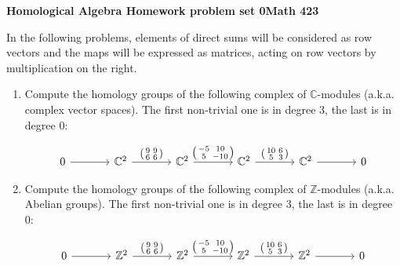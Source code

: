 \documentclass[12pt]{article}
\newcommand{\ZZ}{\mathbb{Z}}
\newcommand{\CC}{\mathbb{C}}
\begin{document}
\begin{center}{\Large
\vspace{2cm}

\bf  Homological Algebra Homework problem set 0\quad   Math 423\quad  \\
}
\vspace{.5in}

\end{center}

In the following problems, elements of direct sums will be considered
as row vectors and the maps will be expressed as matrices, acting on
row vectors by multiplication on the right. 

\begin{enumerate}
\item Compute the homology groups of the following complex of
$\CC$-modules (a.k.a. complex vector spaces). The first non-trivial
one is in degree 3, the last is in degree 0:

\[
\begin{tikzcd}[column sep=large,ampersand replacement=\&]
0 \arrow{r} \&
\CC^{2} \arrow{r}{
 \left( \begin{smallmatrix} 9 & 9 \\ 6 & 6 \end{smallmatrix}  \right) } \& 
\CC^{2} \arrow{r}{ \left( \begin{smallmatrix} -5 & 10 \\ 5 & -10 \end{smallmatrix}  \right) } \& 
\CC^{2} \arrow{r}{  \left( \begin{smallmatrix} 10 & 6 \\ 5 & 3 \end{smallmatrix} \right) } \&
\CC^{2} \arrow{r} \& 0 
\end{tikzcd}
\]
\item Compute the homology groups of the following complex of
$\ZZ $-modules (a.k.a. Abelian groups). The first non-trivial
one is in degree 3, the last is in degree 0:

\[
\begin{tikzcd}[column sep=large,ampersand replacement=\&]
0 \arrow{r} \&
\ZZ^{2} \arrow{r}{
 \left( \begin{smallmatrix} 9 & 9 \\ 6 & 6 \end{smallmatrix}  \right) } \& 
\ZZ^{2} \arrow{r}{ \left( \begin{smallmatrix} -5 & 10 \\ 5 & -10 \end{smallmatrix}  \right) } \& 
\ZZ^{2} \arrow{r}{  \left( \begin{smallmatrix} 10 & 6 \\ 5 & 3 \end{smallmatrix} \right) } \&
\ZZ^{2} \arrow{r} \& 0 
\end{tikzcd}
\]



\end{enumerate}
\end{document}
